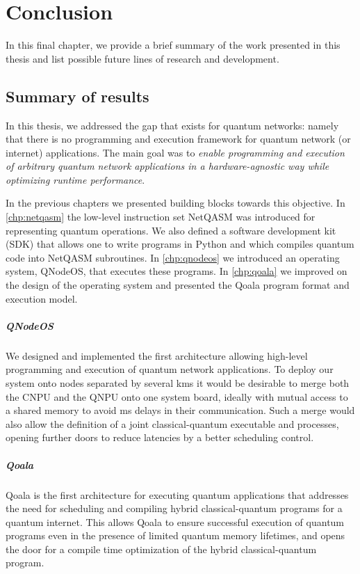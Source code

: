 \chapter{Conclusion}
\label{chp:conclusion}

In this final chapter, we provide a brief summary of the work presented in this thesis and list possible future lines of research and development.

\section{Summary of results}
In this thesis, we addressed the gap that exists for quantum networks: namely that there is no programming and execution framework for quantum network (or internet) applications.
The main goal was to \emph{enable programming and execution of arbitrary quantum network applications in a hardware-agnostic way while optimizing runtime performance}.

In the previous chapters we presented building blocks towards this objective.
In \cref{chp:netqasm} the low-level instruction set NetQASM was introduced for representing quantum operations.
We also defined a software development kit (SDK) that allows one to write programs in Python and which compiles quantum code into NetQASM subroutines.
In \cref{chp:qnodeos} we introduced an operating system, QNodeOS, that executes these programs.
In \cref{chp:qoala} we improved on the design of the operating system and presented the Qoala program format and execution model.

\paragraph{QNodeOS}
We designed and implemented the first architecture allowing high-level programming and execution of quantum network applications. To deploy our system onto nodes separated by several kms it would be desirable to merge both the CNPU and the QNPU onto one system board, ideally with mutual access to a shared memory to avoid ms delays in their communication. Such a merge would also allow the definition of a joint classical-quantum executable and processes, opening further doors to reduce latencies by a better scheduling control.

\paragraph{Qoala}
Qoala is the first architecture for executing quantum applications that addresses the need for scheduling and compiling hybrid classical-quantum programs for a quantum internet.
This allows Qoala to ensure successful execution of quantum programs even in the presence of limited quantum memory lifetimes, and opens the door for a compile time optimization of the hybrid classical-quantum program.


